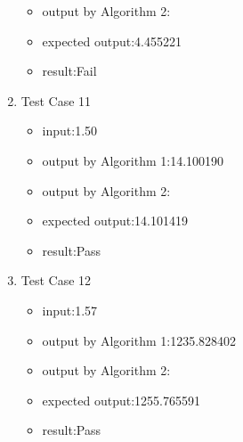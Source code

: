 \documentclass[10pt,a4paper,twoside]{article}
\begin{document}
\begin{enumerate}
\begin{itemize}
    \item output by Algorithm 2:
    \item expected output:4.455221
    \item result:Fail
\end{itemize}
\item 
Test Case 11
\begin{itemize}
    \item input:1.50
    \item output by Algorithm 1:14.100190
    \item output by Algorithm 2:
    \item expected output:14.101419
    \item result:Pass
\end{itemize}
\item 
Test Case 12
\begin{itemize}
    \item input:1.57
   \item output by Algorithm 1:1235.828402
    \item output by Algorithm 2:
    \item expected output:1255.765591
    \item result:Pass
\end{itemize}

\end{enumerate}





\end{document}

